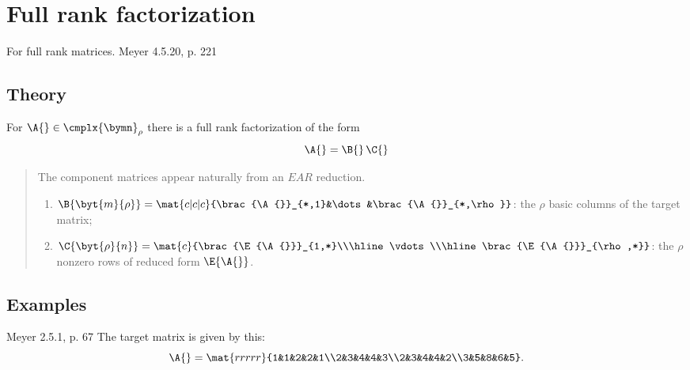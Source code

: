 \section[$\pee{}\A{}=\B{}\C{}$]{Full rank factorization}
For full rank matrices. Meyer 4.5.20, p. 221

\subsection{Theory}
For $\A{}\in\cmplx{\bymn}_{\rho}$ there is a full rank factorization of the form
\begin{equation}
  \A{}=\B{}\,\C{}
\end{equation}
\begin{quote}
The component matrices appear naturally from an $EAR$ reduction.
\begin{enumerate}
\item $\B{\byt{m}{\rho}} = \mat{c|c|c}{\brac{\A{}}_{*,1}&\dots&\brac{\A{}}_{*,\rho}}$: the $\rho$ basic columns of the target matrix;
\item $\C{\byt{\rho}{n}} = \mat{c}{\brac{\E{\A{}}}_{1,*}\\\hline\vdots\\\hline\brac{\E{\A{}}}_{\rho,*}}$: the $\rho$ nonzero rows of reduced form $\E{\A{}}$.
\end{enumerate}

\end{quote}

\subsection{Examples}
Meyer 2.5.1, p. 67
The target matrix is given by this:
\begin{equation}
  \A{} = \mat{rrrrr}{1&1&2&2&1\\2&3&4&4&3\\2&3&4&4&2\\3&5&8&6&5}.
\end{equation}


